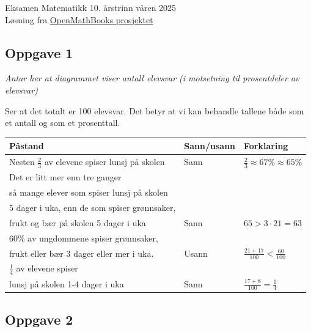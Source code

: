 





{\Large Eksamen Matematikk 10. årstrinn våren 2025\hfill \\ {\footnotesize Løsning fra \color{blue} \href{https://sindreheggen.wordpress.com/}{OpenMathBooks prosjektet}}}	

\subsection*{Oppgave 1}
\textit{Antar her at diagrammet viser antall elevsvar (i motsetning til prosentdeler av elevsvar)} \os

Ser at det totalt er 100 elevsvar. Det betyr at vi kan behandle tallene både som et antall og som et prosenttall.

\begin{center}
	\begin{tabular}{l | l | l}
		\textbf{Påstand} & \textbf{Sann/usann} & \textbf{Forklaring} \\ \hline
		Nesten $\frac{2}{3}$ av elevene spiser lunsj på skolen& Sann & $\frac{2}{3}\approx67\%\approx65\%$ \\ \hline
		Det er litt mer enn tre ganger & &\\ så mange elever som spiser lunsj på 
		skolen & & \\ 5 dager i uka, enn de som spiser grønnsaker,& &\\ frukt og bær på
		skolen 5 dager i uka & Sann & $65>3\cdot21=63$ \\ \hline
		60\% av ungdommene spiser grønnsaker, & &\\ 
		frukt eller bær 3 dager eller
		mer i uka. & Usann &  $\frac{21+17}{100}<\frac{60}{100}$ \\ \hline
		$\frac{1}{4}$ av elevene spiser & &\\ lunsj på skolen 1-4 dager i uka & Sann & $\frac{17+8}{100}=\frac{1}{4}$ 
	\end{tabular}
\end{center}


\subsection*{Oppgave 2}
